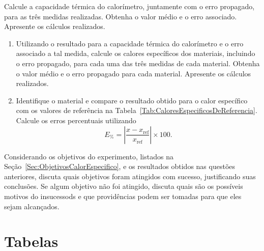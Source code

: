 \begin{question}[type={exam}]{2}
Calcule a capacidade térmica do calorímetro, juntamente com o erro propagado, para as três medidas realizadas. Obtenha o valor médio e o erro associado. Apresente os cálculos realizados.
\end{question}

\begin{question}[type={exam}]{3}
\begin{enumerate}[label=\roman*.]
\item Utilizando o resultado para a capacidade térmica do calorímetro e o erro associado a tal medida, calcule os calores específicos dos materiais, incluindo o erro propagado, para cada uma das três medidas de cada material. Obtenha o valor médio e o erro propagado para cada material. Apresente os cálculos realizados.

\item Identifique o material e compare o resultado obtido para o calor específico com os valores de referência na Tabela~\ref{Tab:CaloresEspecificosDeReferencia}. Calcule os erros percentuais utilizando
\begin{equation}
	E_{\%} = \left|\frac{x-x_{\text{ref}}}{x_{\text{ref}}}\right| \times 100.
\end{equation}
\end{enumerate}
\end{question}

\begin{question}[type={exam}]{2}
Considerando os objetivos do experimento, listados na Seção~\ref{Sec:ObjetivosCalorEspecifico}, e os resultados obtidos nas questões anteriores, discuta quais objetivos foram atingidos com sucesso, justificando suas conclusões. Se algum objetivo não foi atingido, discuta quais são os possíveis motivos do insucessods e que providências podem ser tomadas para que eles sejam alcançados.
\end{question}

\vfill
\pagebreak
\section{Tabelas}

